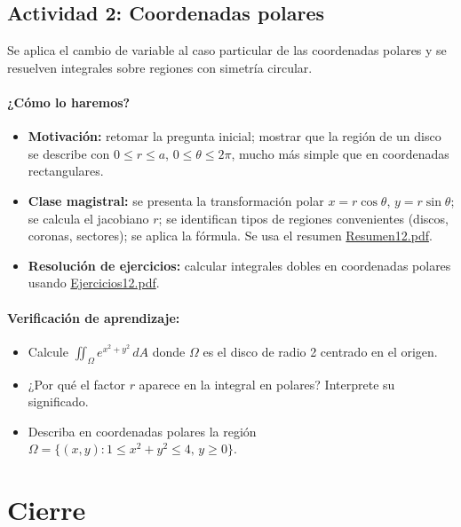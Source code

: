 \documentclass[a4,11pt]{aleph-notas}
\begin{document}
\subsection*{Actividad 2: Coordenadas polares}
Se aplica el cambio de variable al caso particular de las coordenadas polares y se resuelven integrales sobre regiones con simetría circular.

\paragraph{¿Cómo lo haremos?}
\begin{itemize}[leftmargin=*]
    \item \textbf{Motivación:} retomar la pregunta inicial; mostrar que la región de un disco se describe con $0\leq r\leq a$, $0\leq\theta\leq 2\pi$, mucho más simple que en coordenadas rectangulares.
    \item \textbf{Clase magistral:} se presenta la transformación polar $x=r\cos\theta$, $y=r\sin\theta$; se calcula el jacobiano $r$; se identifican tipos de regiones convenientes (discos, coronas, sectores); se aplica la fórmula. Se usa el resumen \href{https://andres-merino.github.io/MatematicaIII-05-N0051/01Resumen/Resumen12.pdf}{Resumen12.pdf}.
    \item \textbf{Resolución de ejercicios:} calcular integrales dobles en coordenadas polares usando \href{https://andres-merino.github.io/MatematicaIII-05-N0051/04Ejercicios/Ejercicios12.pdf}{Ejercicios12.pdf}.
\end{itemize}

\paragraph{Verificación de aprendizaje:}
\begin{itemize}[leftmargin=*]
    \item Calcule $\iint_\Omega e^{x^2+y^2}\,dA$ donde $\Omega$ es el disco de radio 2 centrado en el origen.
    \item ¿Por qué el factor $r$ aparece en la integral en polares? Interprete su significado.
    \item Describa en coordenadas polares la región $\Omega=\{(x,y): 1\leq x^2+y^2\leq 4,\, y\geq 0\}$.
\end{itemize}

\section*{Cierre}
\end{document}
